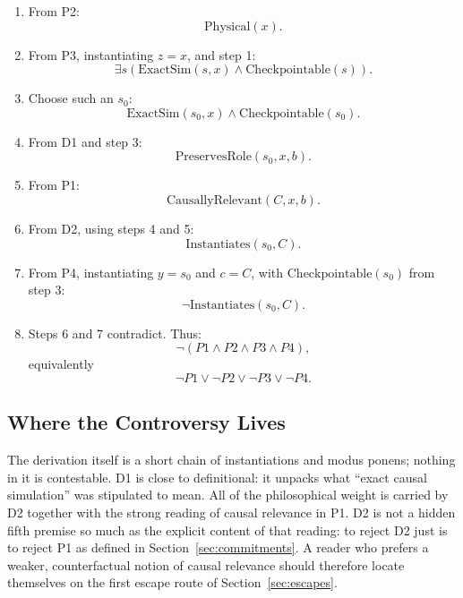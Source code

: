 \documentclass[11pt]{article}
\begin{document}
\begin{enumerate}
  \item From P2:
        \[
          \mathrm{Physical}(x).
        \]

  \item From P3, instantiating \(z=x\), and step 1:
        \[
          \exists s(\mathrm{ExactSim}(s,x)\land \mathrm{Checkpointable}(s)).
        \]

  \item Choose such an \(s_0\):
        \[
          \mathrm{ExactSim}(s_0,x)\land \mathrm{Checkpointable}(s_0).
        \]

  \item From D1 and step 3:
        \[
          \mathrm{PreservesRole}(s_0,x,b).
        \]

  \item From P1:
        \[
          \mathrm{CausallyRelevant}(C,x,b).
        \]

  \item From D2, using steps 4 and 5:
        \[
          \mathrm{Instantiates}(s_0,C).
        \]

  \item From P4, instantiating \(y=s_0\) and \(c=C\), with
        \(\mathrm{Checkpointable}(s_0)\) from step 3:
        \[
          \neg \mathrm{Instantiates}(s_0,C).
        \]

  \item Steps 6 and 7 contradict. Thus:
        \[
          \neg(P1\land P2\land P3\land P4),
        \]
        equivalently
        \[
          \neg P1\lor \neg P2\lor \neg P3\lor \neg P4.
        \]
\end{enumerate}

\subsection*{Where the Controversy Lives}

The derivation itself is a short chain of instantiations and modus ponens;
nothing in it is contestable. D1 is close to definitional: it unpacks what
``exact causal simulation'' was stipulated to mean. All of the philosophical
weight is carried by D2 together with the strong reading of causal relevance
in P1. D2 is not a hidden fifth premise so much as the explicit content of
that reading: to reject D2 just is to reject P1 as defined in
Section~\ref{sec:commitments}. A reader who prefers a weaker, counterfactual
notion of causal relevance should therefore locate themselves on the first
escape route of Section~\ref{sec:escapes}.
\end{document}
